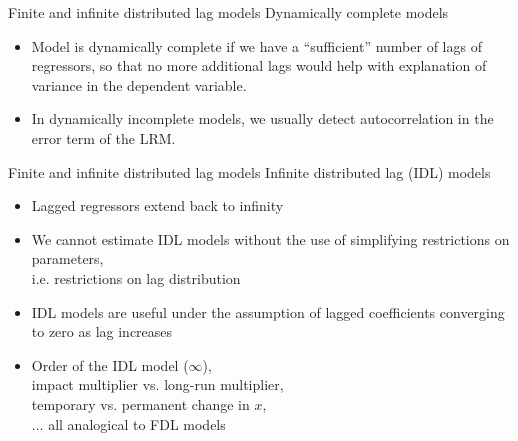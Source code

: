 \documentclass{beamer}
\begin{document}
\begin{frame}{Finite and infinite distributed lag models}
Dynamically complete models
\vspace{0.5cm}
\begin{itemize}
\item Model is dynamically complete if we have a ``sufficient'' number of lags of regressors, so that no more additional lags would help with explanation of variance in the dependent variable. 
\vspace{0.5cm}
\item In dynamically incomplete models, we usually detect autocorrelation in the error term of the LRM.
\end{itemize}
\end{frame}


\begin{frame}{Finite and infinite distributed lag models}
Infinite distributed lag (IDL) models
\begin{itemize}
\item Lagged regressors extend back to infinity
\item We cannot estimate IDL models without the use of simplifying restrictions on parameters, \\i.e. restrictions on lag distribution
\smallskip
\item IDL models are useful under the assumption of lagged coefficients converging to zero as lag increases
\smallskip
\item Order of the IDL model ($\infty$), 
\\impact multiplier vs. long-run multiplier, 
\\temporary vs. permanent change in $x$,
\\ $\dots$ all analogical to FDL models
\end{itemize}
\end{frame}

\end{document}

